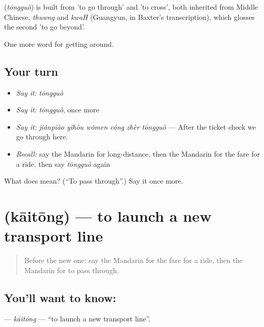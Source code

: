 \begin{cousinweb}
\textbf{} (\emph{tōngguò}) is built from  'to go through' and  'to cross', both inherited from Middle Chinese, \emph{thuwng} and \emph{kwaH} (Guangyun, in Baxter's transcription), which glosses the second 'to go beyond'.
\end{cousinweb}

\begin{grammarlens}[title={What you've built}]
One more word for getting around.
\end{grammarlens}

\subsection*{Your turn}
\begin{itemize}
\raggedright
  \item \emph{Say it:} \emph{tōngguò}
  \item \emph{Say it:} \emph{tōngguò}, once more
  \item \emph{Say it:} \emph{jiǎnpiào yǐhòu wǒmen cóng zhèr tōngguò} — After the ticket check we go through here.
  \item \emph{Recall:} say the Mandarin for long-distance, then the Mandarin for the fare for a ride, then say \emph{tōngguò} again
\end{itemize}

\begin{tcolorbox}[breakable,colback=teal!4,colframe=teal!35!black,title={Before you move on}]
What does  mean? (\textquotedblleft{}To pass through\textquotedblright{}.) Say it once more.
\end{tcolorbox}
\section[\texorpdfstring{\zh{开通} (kāitōng)}{开通 (kāitōng)}]{ (kāitōng) — to launch a new transport line}

\label{lesson:ZH-C410-kaitong}



\begin{quote}
Before the new one: say the Mandarin for the fare for a ride, then the Mandarin for to pass through.
\end{quote}

\subsection*{You'll want to know: }
\textbf{} — \emph{kāitōng} — \textquotedblleft{}to launch a new transport line\textquotedblright{}.

